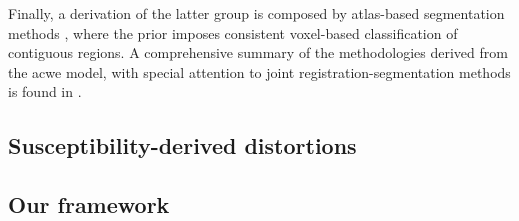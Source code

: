 Finally, a derivation of the latter group is composed by atlas-based segmentation methods
  \citep{gorthi_segmentation_2009,gorthi_active_2011,pohl_unifying_2005,pohl_bayesian_2006,
  wang_joint_2006}, where the prior imposes consistent voxel-based classification of contiguous
  regions.
A comprehensive summary of the methodologies derived from the \gls{acwe} model, with special attention
  to joint registration-segmentation methods is found in \citep{gorthi_active_2011}.


\subsection{Susceptibility-derived distortions}

\subsection{Our framework}
\label{sec:our_framework}

%
%

